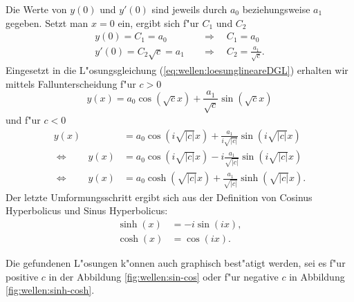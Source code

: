 Die Werte von $y(0)$ und $y'(0)$ sind jeweils durch $a_0$ beziehungsweise $a_1$ 
gegeben. Setzt man $x = 0$ ein, ergibt sich f"ur $C_1$ und $C_2$
\begin{equation*}
	\begin{split}
		y(0) = C_1 = a_0 &\quad\Rightarrow\quad C_1 = a_0 \\
		y'(0) = C_2 \sqrt{c} = a_1 &\quad\Rightarrow\quad C_2 = \frac{a_1}{\sqrt{c}}.
	\end{split}
\end{equation*}
Eingesetzt in die L"osungsgleichung (\ref{eq:wellen:loesunglineareDGL}) 
erhalten wir mittels Fallunterscheidung f"ur $c > 0$
\begin{equation*}
	y(x) = a_0 \cos(\sqrt{c}x) + \frac{a_1}{\sqrt{c}} \sin(\sqrt{c}x)
\end{equation*}
und f"ur $c < 0$
\begin{equation*}
	\begin{split}
		y(x) &= a_0 \cos(i\sqrt{|c|}x) + 
		\frac{a_1}{i\sqrt{|c|}}\sin(i\sqrt{|c|}x)\\
		\Leftrightarrow \qquad
		y(x) &= a_0 \cos(i\sqrt{|c|}x) - 
		i\frac{a_1}{\sqrt{|c|}}\sin(i\sqrt{|c|}x)\\
		\Leftrightarrow \qquad
		y(x) &= a_0 \cosh(\sqrt{|c|}x) + 
		\frac{a_1}{\sqrt{|c|}}\sinh(\sqrt{|c|}x).
	\end{split}	
\end{equation*}
Der letzte Umformungsschritt ergibt sich aus der Definition von Cosinus 
Hyperbolicus und Sinus Hyperbolicus:
\begin{equation*}
	\begin{split}
		\sinh(x) &= -i \sin(ix),\\
		\cosh(x) &= \cos (ix).
	\end{split}
\end{equation*}

Die gefundenen L"osungen k"onnen auch graphisch best"atigt werden, sei es f"ur 
positive $c$ in der Abbildung \ref{fig:wellen:sin-cos} oder f"ur negative $c$ 
in Abbildung \ref{fig:wellen:sinh-cosh}.

